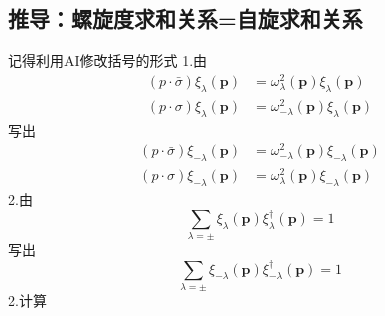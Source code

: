 \subsection{推导：螺旋度求和关系=自旋求和关系}
记得利用AI修改括号的形式
1.由
\begin{equation}
    \begin{aligned}
        \left( p\cdot \bar{\sigma} \right) \xi _{\lambda}\left( \mathbf{p} \right) &=\omega _{\lambda}^{2}\left( \mathbf{p} \right) \xi _{\lambda}\left( \mathbf{p} \right) 
\\
\left( p\cdot \sigma \right) \xi _{\lambda}\left( \mathbf{p} \right) &=\omega _{-\lambda}^{2}\left( \mathbf{p} \right) \xi _{\lambda}\left( \mathbf{p} \right) 
    \end{aligned}
\end{equation}
写出
\begin{equation}
    \begin{aligned}
        \left( p\cdot \bar{\sigma} \right) \xi _{-\lambda}\left( \mathbf{p} \right) &=\omega _{-\lambda}^{2}\left( \mathbf{p} \right) \xi _{-\lambda}\left( \mathbf{p} \right) 
\\
\left( p\cdot \sigma \right) \xi _{-\lambda}\left( \mathbf{p} \right) &=\omega _{\lambda}^{2}\left( \mathbf{p} \right) \xi _{-\lambda}\left( \mathbf{p} \right) 
    \end{aligned}
\end{equation}
2.由
\begin{equation}
    \sum_{\lambda =\pm}{\xi _{\lambda}}\left( \mathbf{p} \right) \xi _{\lambda}^{\dagger}\left( \mathbf{p} \right) =1
\end{equation}
写出
\begin{equation}
    \sum_{\lambda =\pm}{\xi _{-\lambda}}\left( \mathbf{p} \right) \xi _{-\lambda}^{\dagger}\left( \mathbf{p} \right) =1
\end{equation}
2.计算
